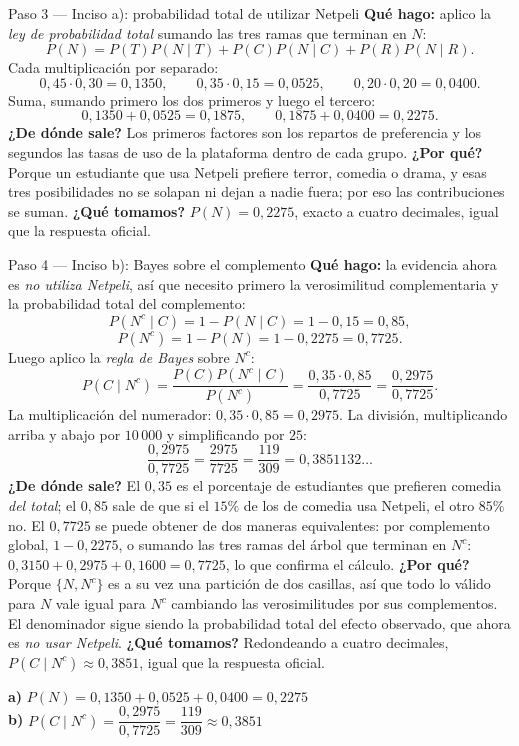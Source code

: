 \documentclass[11pt]{article}
\begin{document}
\begin{sol}
\begin{paso}{Paso 3 --- Inciso a): probabilidad total de utilizar Netpeli}
\textbf{Qué hago:} aplico la \emph{ley de probabilidad total} sumando las tres ramas que terminan en $N$:
\[
P(N)=P(T)P(N\mid T)+P(C)P(N\mid C)+P(R)P(N\mid R).
\]
Cada multiplicación por separado:
\[
0,45\cdot 0,30=0,1350,\qquad 0,35\cdot 0,15=0,0525,\qquad 0,20\cdot 0,20=0,0400 .
\]
Suma, sumando primero los dos primeros y luego el tercero:
\[
0,1350+0,0525=0,1875,\qquad 0,1875+0,0400=0,2275 .
\]
\textbf{¿De dónde sale?} Los primeros factores son los repartos de preferencia y los segundos las tasas de uso de la plataforma dentro de cada grupo.
\textbf{¿Por qué?} Porque un estudiante que usa Netpeli prefiere terror, comedia o drama, y esas tres posibilidades no se solapan ni dejan a nadie fuera; por eso las contribuciones se suman.
\textbf{¿Qué tomamos?} $P(N)=0,2275$, exacto a cuatro decimales, igual que la respuesta oficial.
\end{paso}

\begin{paso}{Paso 4 --- Inciso b): Bayes sobre el complemento}
\textbf{Qué hago:} la evidencia ahora es \emph{no utiliza Netpeli}, así que necesito primero la verosimilitud complementaria y la probabilidad total del complemento:
\[
P(N^{c}\mid C)=1-P(N\mid C)=1-0,15=0,85,
\]
\[
P(N^{c})=1-P(N)=1-0,2275=0,7725 .
\]
Luego aplico la \emph{regla de Bayes} sobre $N^{c}$:
\[
P(C\mid N^{c})=\frac{P(C)P(N^{c}\mid C)}{P(N^{c})}=\frac{0,35\cdot 0,85}{0,7725}=\frac{0,2975}{0,7725}.
\]
La multiplicación del numerador: $0,35\cdot 0,85=0,2975$. La división, multiplicando arriba y abajo por $10\,000$ y simplificando por $25$:
\[
\frac{0,2975}{0,7725}=\frac{2975}{7725}=\frac{119}{309}=0,3851132\ldots
\]
\textbf{¿De dónde sale?} El $0,35$ es el porcentaje de estudiantes que prefieren comedia \emph{del total}; el $0,85$ sale de que si el $15\%$ de los de comedia usa Netpeli, el otro $85\%$ no. El $0,7725$ se puede obtener de dos maneras equivalentes: por complemento global, $1-0,2275$, o sumando las tres ramas del árbol que terminan en $N^{c}$: $0,3150+0,2975+0,1600=0,7725$, lo que confirma el cálculo.
\textbf{¿Por qué?} Porque $\{N,N^{c}\}$ es a su vez una partición de dos casillas, así que todo lo válido para $N$ vale igual para $N^{c}$ cambiando las verosimilitudes por sus complementos. El denominador sigue siendo la probabilidad total del efecto observado, que ahora es \emph{no usar Netpeli}.
\textbf{¿Qué tomamos?} Redondeando a cuatro decimales, $P(C\mid N^{c})\approx 0,3851$, igual que la respuesta oficial.
\end{paso}

\begin{resp}
\textbf{a)} $P(N)=0,1350+0,0525+0,0400=0,2275$\\
\textbf{b)} $P(C\mid N^{c})=\dfrac{0,2975}{0,7725}=\dfrac{119}{309}\approx 0,3851$
\end{resp}

\end{sol}
\end{document}

